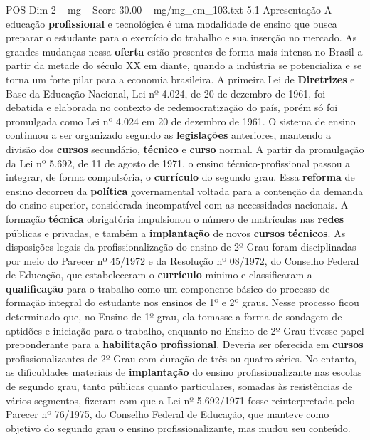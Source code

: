 \begin{textsample}{POS Dim 2 – mg – Score 30.00 – mg/mg\_em\_103.txt}  \label{ex:f2_pos_191}
5.1 Apresentação A educação \textbf{profissional} e tecnológica é uma modalidade de ensino que busca preparar o estudante para o exercício do trabalho e sua inserção no mercado.
As grandes mudanças nessa \textbf{oferta} estão presentes de forma mais intensa no Brasil a partir da metade do século XX em diante, quando a indústria se potencializa e se torna um forte pilar para a economia brasileira.
A primeira Lei de \textbf{Diretrizes} e Base da Educação Nacional, Lei nº 4.024, de 20 de dezembro de 1961, foi debatida e elaborada no contexto de redemocratização do país, porém só foi promulgada como Lei nº 4.024 em 20 de dezembro de 1961.
O sistema de ensino continuou a ser organizado segundo as \textbf{legislações} anteriores, mantendo a divisão dos \textbf{cursos} secundário, \textbf{técnico} e \textbf{curso} normal.
A partir da promulgação da Lei nº 5.692, de 11 de agosto de 1971, o ensino técnico-profissional passou a integrar, de forma compulsória, o \textbf{currículo} do segundo grau.
Essa \textbf{reforma} de ensino decorreu da \textbf{política} governamental voltada para a contenção da demanda do ensino superior, considerada incompatível com as necessidades nacionais.
A formação \textbf{técnica} obrigatória impulsionou o número de matrículas nas \textbf{redes} públicas e privadas, e também a \textbf{implantação} de novos \textbf{cursos} \textbf{técnicos}.
As disposições legais da profissionalização do ensino de 2º Grau foram disciplinadas por meio do Parecer nº 45/1972 e da Resolução nº 08/1972, do Conselho Federal de Educação, que estabeleceram o \textbf{currículo} mínimo e classificaram a \textbf{qualificação} para o trabalho como um componente básico do processo de formação integral do estudante nos ensinos de 1º e 2º graus.
Nesse processo ficou determinado que, no Ensino de 1º grau, ela tomasse a forma de sondagem de aptidões e iniciação para o trabalho, enquanto no Ensino de 2º Grau tivesse papel preponderante para a \textbf{habilitação} \textbf{profissional}.
Deveria ser oferecida em \textbf{cursos} profissionalizantes de 2º Grau com duração de três ou quatro séries.
No entanto, as dificuldades materiais de \textbf{implantação} do ensino profissionalizante nas escolas de segundo grau, tanto públicas quanto particulares, somadas às resistências de vários segmentos, fizeram com que a Lei nº 5.692/1971 fosse reinterpretada pelo Parecer nº 76/1975, do Conselho Federal de Educação, que manteve como objetivo do segundo grau o ensino profissionalizante, mas mudou seu conteúdo.

\end{textsample}

